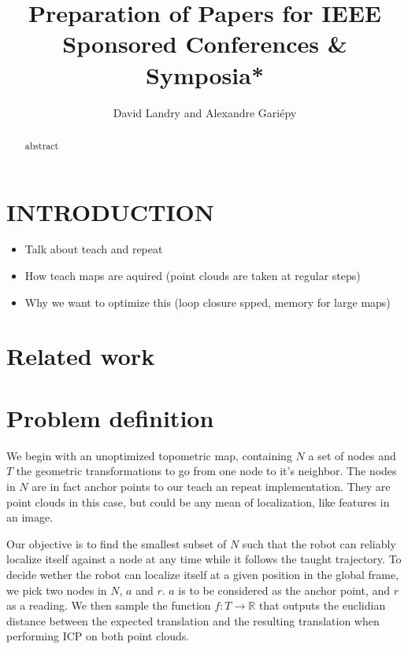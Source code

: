 \documentclass[letterpaper,10 pt,conference]{ieeeconf}
\title{\LARGE \bf
Preparation of Papers for IEEE Sponsored Conferences \& Symposia*
}
\author{David Landry and Alexandre Gari\'epy}
\begin{document}
\maketitle
\thispagestyle{empty}
\pagestyle{empty}


\begin{abstract}

  abstract

\end{abstract}

\section{INTRODUCTION}

\begin{itemize}
    \item Talk about teach and repeat
    \item How teach maps are aquired (point clouds are taken at regular steps)
    \item Why we want to optimize this (loop closure spped, memory for large maps)
\end{itemize}

\section{Related work}


\section{Problem definition}

We begin with an unoptimized topometric map, containing $N$ a set of nodes and $T$ the geometric transformations to go
from one node to it's neighbor. The nodes in $N$ are in fact anchor points to our teach an repeat
implementation. They are point clouds in this case, but could be any mean of localization, like
features in an image.

Our objective is to find the smallest subset of $N$ such that the robot
can reliably localize itself against a node at any time while it follows the taught trajectory. To
decide wether the robot can localize itself at a given position in the global frame, we pick two
nodes in $N$, $a$ and $r$. $a$ is to be considered as the anchor point, and $r$ as a reading. We
then sample the function $f: T \rightarrow \mathbb{R}$ that outputs the euclidian distance between
the expected translation and the resulting translation when performing ICP on both point clouds.
\end{document}
